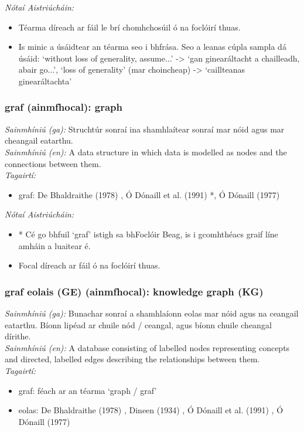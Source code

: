  \noindent \textit{Nótaí Aistriúcháin:}
\begin{itemize}
	\item Téarma díreach ar fáil le brí chomhchosúil ó na foclóirí thuas.
	\item Is minic a úsáidtear an téarma seo i bhfrása. Seo a leanas cúpla sampla dá úsáid: `without loss of generality, assume...' -> `gan ginearáltacht a chailleadh, abair go...', `loss of generality' (mar choincheap) -> `caillteanas ginearáltachta'
\end{itemize}


\subsubsection*{graf (ainmfhocal): graph}
 \noindent \textit{Sainmhíniú (ga):} Struchtúr sonraí ina shamhlaítear sonraí mar nóid agus mar cheangail eatarthu.
\\
 \noindent \textit{Sainmhíniú (en):} A data structure in which data is modelled as nodes and the connections between them.
\\
 \noindent \textit{Tagairtí:}
\begin{itemize}
	\item graf: De Bhaldraithe (1978) \cite{de-bhaldraithe}, Ó Dónaill et al. (1991) \cite{focloir-beag}*, Ó Dónaill (1977) \cite{odonaill}
\end{itemize}

 \noindent \textit{Nótaí Aistriúcháin:}
\begin{itemize}
	\item * Cé go bhfuil `graf' istigh sa bhFoclóir Beag, is i gcomhthéacs graif líne amháin a luaitear é.
	\item Focal díreach ar fáil ó na foclóirí thuas.
\end{itemize}


\subsubsection*{graf eolais (GE) (ainmfhocal): knowledge graph (KG)}
 \noindent \textit{Sainmhíniú (ga):} Bunachar sonraí a shamhlaíonn eolas mar nóid agus na ceangail eatarthu. Bíonn lipéad ar chuile nód / ceangal, agus bíonn chuile cheangal dírithe.
\\
 \noindent \textit{Sainmhíniú (en):} A database consisting of labelled nodes representing concepts and directed, labelled edges describing the relationships between them.
\\
 \noindent \textit{Tagairtí:}
\begin{itemize}
	\item graf: féach ar an téarma `graph / graf'
	\item eolas: De Bhaldraithe (1978) \cite{de-bhaldraithe}, Dineen (1934) \cite{dineen}, Ó Dónaill et al. (1991) \cite{focloir-beag}, Ó Dónaill (1977) \cite{odonaill}
\end{itemize}


